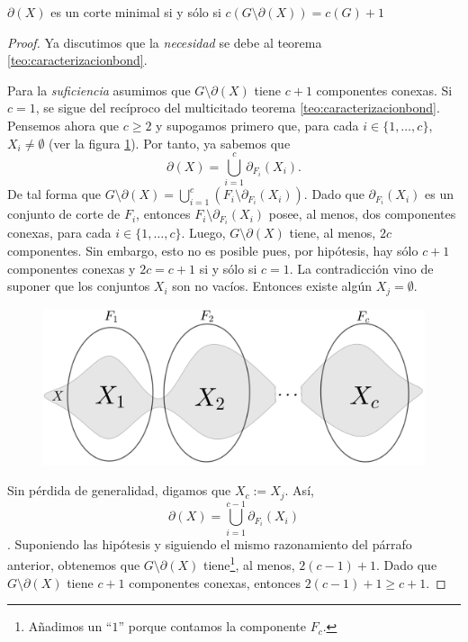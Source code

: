    \begin{teo} \label{teo:caracterizacionbond2}
   $\partial(X)$ es un corte minimal si y sólo si $c(G\setminus \partial(X)) = c(G) + 1$
   \end{teo}
   \begin{proof} Ya discutimos que la \textit{necesidad} se debe al teorema \ref{teo:caracterizacionbond}.
   
   Para la \textit{suficiencia}  asumimos que $G \setminus \partial(X)$ tiene $c+1$ componentes conexas. Si $c=1$, se sigue del recíproco del multicitado teorema \ref{teo:caracterizacionbond}. Pensemos ahora que $c\geq 2$ y supogamos primero que, para cada $i \in \{1, \ldots, c\}$, $X_{i} \neq \emptyset$ (ver la figura \ref{fig:componentes}). Por tanto, ya sabemos que
$$\partial(X)=\bigcup_{i=1}^{c}\partial_{F_{i}}(X_{i}).$$
De tal forma que $G \setminus \partial(X)=\bigcup_{i=1}^{c}(F_{i} \setminus \partial_{F_{i}}(X_{i}))$. Dado que $\partial_{F_{i}}(X_{i})$ es un conjunto de corte de $F_{i}$, entonces $F_{i} \setminus \partial_{F_{i}}(X_{i})$ posee, al menos, dos componentes conexas, para cada $i \in \{1, \ldots, c\}$. Luego, $G \setminus \partial(X)$ tiene, al menos, $2c$ componentes. Sin embargo, esto no es posible pues, por hipótesis, hay sólo $c+1$ componentes conexas y $2c = c+1$ si y sólo si $c=1$. La contradicción vino de suponer que los conjuntos $X_{i}$ son no vacíos. Entonces existe algún $X_{j} = \emptyset$. 

\begin{figure}[H]
    \centering
    \includegraphics[scale=0.15]{img/imgchapter2/componentes.jpg}
    \caption{}
    \label{fig:componentes}
\end{figure}

Sin pérdida de generalidad, digamos que $X_{c}:=X_{j}$. Así, $$\partial(X) = \bigcup_{i=1}^{c-1} \partial_{F_{i}}(X_{i})$$. Suponiendo las hipótesis y siguiendo el mismo razonamiento del párrafo anterior, obtenemos que $G\setminus \partial(X)$ tiene\footnote{Añadimos un ``$1$'' porque contamos la componente $F_{c}$.}, al menos, $2(c-1) + 1$. Dado que $G \setminus \partial(X)$ tiene $c+1$ componentes conexas, entonces $2(c-1) + 1 \geq c+1$. 


\end{proof}
